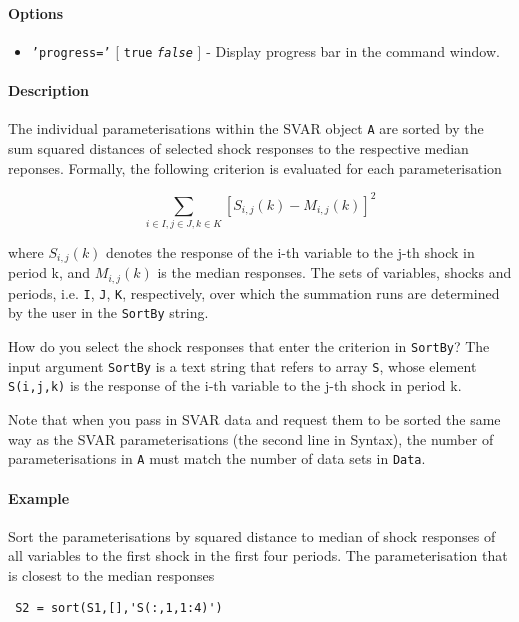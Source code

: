  \paragraph{Options}
 
 \begin{itemize}
 \item
   \texttt{'progress='} {[} \texttt{true} \textbar{}
   \emph{\texttt{false}} {]} - Display progress bar in the command
   window.
 \end{itemize}
 
 \paragraph{Description}
 
 The individual parameterisations within the SVAR object \texttt{A} are
 sorted by the sum squared distances of selected shock responses to the
 respective median reponses. Formally, the following criterion is
 evaluated for each parameterisation
 
 \[ \sum_{i\in I,j\in J,k\in K} \left[ S_{i,j}(k) - M_{i,j}(k) \right]^2 \]
 
 where $S_{i,j}(k)$ denotes the response of the i-th variable to the j-th
 shock in period k, and $M_{i,j}(k)$ is the median responses. The sets of
 variables, shocks and periods, i.e. \texttt{I}, \texttt{J}, \texttt{K},
 respectively, over which the summation runs are determined by the user
 in the \texttt{SortBy} string.
 
 How do you select the shock responses that enter the criterion in
 \texttt{SortBy}? The input argument \texttt{SortBy} is a text string
 that refers to array \texttt{S}, whose element \texttt{S(i,j,k)} is the
 response of the i-th variable to the j-th shock in period k.
 
 Note that when you pass in SVAR data and request them to be sorted the
 same way as the SVAR parameterisations (the second line in Syntax), the
 number of parameterisations in \texttt{A} must match the number of data
 sets in \texttt{Data}.
 
 \paragraph{Example}
 
 Sort the parameterisations by squared distance to median of shock
 responses of all variables to the first shock in the first four periods.
 The parameterisation that is closest to the median responses
 
 \begin{verbatim}
 S2 = sort(S1,[],'S(:,1,1:4)')
 \end{verbatim}


